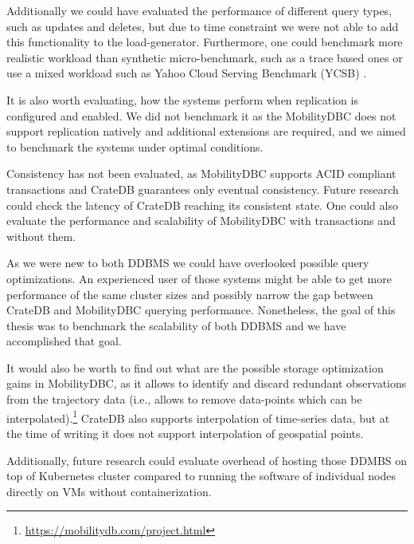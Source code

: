 Additionally we could have evaluated the performance of different query types, such as updates and deletes, but due to time constraint we were not able to add this functionality to the load-generator.
Furthermore, one could benchmark more realistic workload than synthetic micro-benchmark, such as a trace based ones or use a mixed workload such as Yahoo Cloud Serving Benchmark (YCSB) \cite{cooperBenchmarkingCloudServing2010}.

It is also worth evaluating, how the systems perform when replication is configured and enabled.
We did not benchmark it as the MobilityDBC does not support replication natively and additional extensions are required, and we aimed to benchmark the systems under optimal conditions.

Consistency has not been evaluated, as MobilityDBC supports ACID compliant transactions and CrateDB guarantees only eventual consistency.
Future research could check the latency of CrateDB reaching its consistent state.
One could also evaluate the performance and scalability of MobilityDBC with transactions and without them.

As we were new to both DDBMS we could have overlooked possible query optimizations.
An experienced user of those systems might be able to get more performance of the same cluster sizes and possibly narrow the gap between CrateDB and MobilityDBC querying performance.
Nonetheless, the goal of this thesis was to benchmark the scalability of both DDBMS and we have accomplished that goal.

It would also be worth to find out what are the possible storage optimization gains in MobilityDBC, as it allows to identify and discard redundant observations from the trajectory data 
(i.e., allows to remove data-points which can be interpolated).\footnote{\url{https://mobilitydb.com/project.html}}
CrateDB also supports interpolation of time-series data, but at the time of writing it does not support interpolation of geospatial points.


Additionally, future research could evaluate overhead of hosting those DDMBS on top of Kubernetes cluster compared to running the software of individual nodes directly on VMs without containerization.

